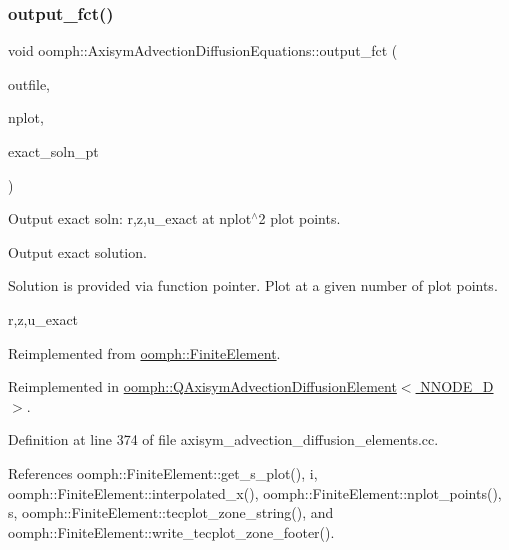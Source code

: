 \mbox{\label{classoomph_1_1AxisymAdvectionDiffusionEquations_a7e09458177108a164dbc0dbf45179d0e}} 
\subsubsection{\texorpdfstring{output\+\_\+fct()}{output\_fct()}}
{\footnotesize\ttfamily void oomph\+::\+Axisym\+Advection\+Diffusion\+Equations\+::output\+\_\+fct (\begin{DoxyParamCaption}\item[{std\+::ostream \&}]{outfile,  }\item[{const unsigned \&}]{nplot,  }\item[{\hyperlink{classoomph_1_1FiniteElement_a690fd33af26cc3e84f39bba6d5a85202}{Finite\+Element\+::\+Steady\+Exact\+Solution\+Fct\+Pt}}]{exact\+\_\+soln\+\_\+pt }\end{DoxyParamCaption})\hspace{0.3cm}{\ttfamily [virtual]}}



Output exact soln\+: r,z,u\+\_\+exact at nplot$^\wedge$2 plot points. 

Output exact solution.

Solution is provided via function pointer. Plot at a given number of plot points.

r,z,u\+\_\+exact 

Reimplemented from \hyperlink{classoomph_1_1FiniteElement_a22b695c714f60ee6cd145be348042035}{oomph\+::\+Finite\+Element}.



Reimplemented in \hyperlink{classoomph_1_1QAxisymAdvectionDiffusionElement_a07a6680226c412753604695d77b19467}{oomph\+::\+Q\+Axisym\+Advection\+Diffusion\+Element$<$ N\+N\+O\+D\+E\+\_\+D $>$}.



Definition at line 374 of file axisym\+\_\+advection\+\_\+diffusion\+\_\+elements.\+cc.



References oomph\+::\+Finite\+Element\+::get\+\_\+s\+\_\+plot(), i, oomph\+::\+Finite\+Element\+::interpolated\+\_\+x(), oomph\+::\+Finite\+Element\+::nplot\+\_\+points(), s, oomph\+::\+Finite\+Element\+::tecplot\+\_\+zone\+\_\+string(), and oomph\+::\+Finite\+Element\+::write\+\_\+tecplot\+\_\+zone\+\_\+footer().



